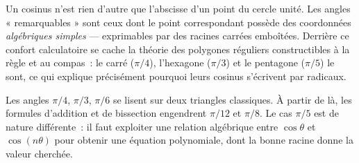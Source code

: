 \begin{significationintuitive}
Un cosinus n'est rien d'autre que l'abscisse d'un point du cercle unité.
Les angles « remarquables » sont ceux dont le point correspondant possède des
coordonnées \emph{algébriques simples} — exprimables par des racines carrées
emboîtées. Derrière ce confort calculatoire se cache la théorie des polygones
réguliers constructibles à la règle et au compas~: le carré ($\pi/4$),
l'hexagone ($\pi/3$) et le pentagone ($\pi/5$) le sont, ce qui explique
précisément pourquoi leurs cosinus s'écrivent par radicaux.
\end{significationintuitive}

\decsep{}


\begin{ideepreuve}
Les angles $\pi/4$, $\pi/3$, $\pi/6$ se lisent sur deux triangles classiques.
À partir de là, les formules d'addition et de bissection engendrent $\pi/12$ et
$\pi/8$. Le cas $\pi/5$ est de nature différente~: il faut exploiter une relation
algébrique entre $\cos\theta$ et $\cos(n\theta)$ pour obtenir une équation
polynomiale, dont la bonne racine donne la valeur cherchée.
\end{ideepreuve}

\vspace{10pt}

